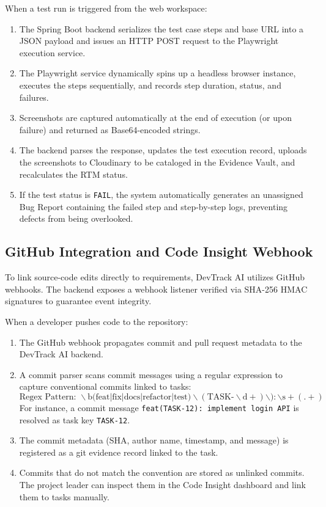 When a test run is triggered from the web workspace:
\begin{enumerate}
    \item The Spring Boot backend serializes the test case steps and base URL into a JSON payload and issues an HTTP POST request to the Playwright execution service.
    \item The Playwright service dynamically spins up a headless browser instance, executes the steps sequentially, and records step duration, status, and failures.
    \item Screenshots are captured automatically at the end of execution (or upon failure) and returned as Base64-encoded strings.
    \item The backend parses the response, updates the test execution record, uploads the screenshots to Cloudinary to be cataloged in the Evidence Vault, and recalculates the RTM status.
    \item If the test status is \texttt{FAIL}, the system automatically generates an unassigned Bug Report containing the failed step and step-by-step logs, preventing defects from being overlooked.
\end{enumerate}

\subsection{GitHub Integration and Code Insight Webhook}

To link source-code edits directly to requirements, DevTrack AI utilizes GitHub webhooks. The backend exposes a webhook listener verified via SHA-256 HMAC signatures to guarantee event integrity. 

When a developer pushes code to the repository:
\begin{enumerate}
    \item The GitHub webhook propagates commit and pull request metadata to the DevTrack AI backend.
    \item A commit parser scans commit messages using a regular expression to capture conventional commits linked to tasks:
    \begin{equation}
    \text{Regex Pattern: } \backslash\text{b(feat|fix|docs|refactor|test)}\backslash(\text{TASK-}\backslash\text{d}+)\backslash):\backslash\text{s}+(.+)
    \end{equation}
    For instance, a commit message \texttt{feat(TASK-12): implement login API} is resolved as task key \texttt{TASK-12}.
    \item The commit metadata (SHA, author name, timestamp, and message) is registered as a git evidence record linked to the task.
    \item Commits that do not match the convention are stored as unlinked commits. The project leader can inspect them in the Code Insight dashboard and link them to tasks manually.
\end{enumerate}

